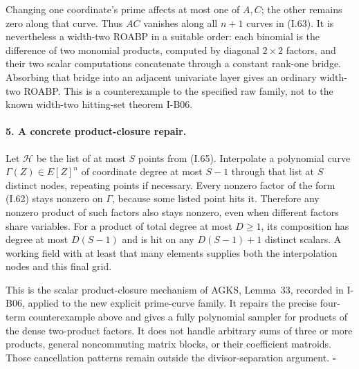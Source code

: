 Changing one coordinate's prime affects at most one of
$A,C$; the other remains zero along that curve.  Thus
$AC$ vanishes along all $n+1$ curves in (I.63).
It is nevertheless a width-two ROABP in a suitable order:
each binomial is the difference of two monomial products,
computed by diagonal $2\times2$ factors, and their two
scalar computations concatenate through a constant
rank-one bridge.  Absorbing that bridge into an adjacent
univariate layer gives an ordinary width-two ROABP.
This is a counterexample to the specified raw family,
not to the known width-two hitting-set theorem I-B06.

\paragraph{5. A concrete product-closure repair.}
Let $\mathcal H$ be the list of at most $S$ points from
(I.65).  Interpolate a polynomial curve
$\Gamma(Z)\in E[Z]^n$ of coordinate degree at most $S-1$
through that list at $S$ distinct nodes, repeating points
if necessary.  Every nonzero factor of the form (I.62)
stays nonzero on $\Gamma$, because some listed point hits it.
Therefore any nonzero product of such factors also stays
nonzero, even when different factors share variables.
For a product of total degree at most $D\ge1$, its
composition has degree at most $D(S-1)$ and is hit on any
$D(S-1)+1$ distinct scalars.  A working field with at least
that many elements supplies both the interpolation nodes
and this final grid.

This is the scalar product-closure mechanism of AGKS,
Lemma~33, recorded in I-B06, applied to the new explicit
prime-curve family.  It repairs the precise four-term
counterexample above and gives a fully polynomial sampler
for products of the dense two-product factors.  It does
not handle arbitrary sums of three or more products,
general noncommuting matrix blocks, or their coefficient
matroids.  Those cancellation patterns remain outside
the divisor-separation argument.
\hfill$\square$
